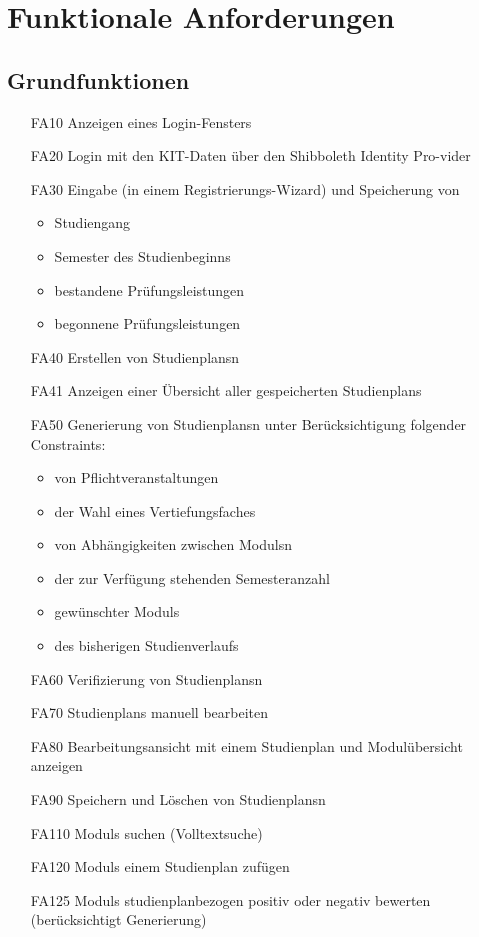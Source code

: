 \section{Funktionale Anforderungen}

	\subsection{Grundfunktionen}
	\begin{itemize}[nosep]	
		\item [FA10] Anzeigen eines Login-Fensters
		\item[FA20] Login mit den KIT-Daten über den Shibboleth Identity Pro-vider
		\item [FA30]Eingabe (in einem Registrierungs-\gls{Wizard}) und Speicherung von
		\begin{itemize}[nosep]
			\item Studiengang
			\item \gls {Semester des Studienbeginns}
			\item bestandene Prüfungsleistungen
			\item begonnene Prüfungsleistungen
		\end{itemize}
		\item [FA40] Erstellen von \glspl{Studienplan}n
		\item [FA41]Anzeigen einer Übersicht aller gespeicherten \glspl{Studienplan}
		\item [FA50] Generierung von \glspl{Studienplan}n unter Berücksichtigung folgender Constraints:
			\begin{itemize}[nosep]
			\item von Pflichtveranstaltungen
			\item der Wahl eines Vertiefungsfaches
			\item von Abhängigkeiten zwischen \glspl{Modul}n
			\item der zur Verfügung stehenden Semesteranzahl
			\item gewünschter \glspl{Modul}
			\item des bisherigen Studienverlaufs
			\end{itemize}
		\item [FA60] Verifizierung von \glspl{Studienplan}n
		\item [FA70] \glspl{Studienplan} manuell bearbeiten
		\item[FA80] Bearbeitungsansicht mit einem \gls{Studienplan} und Modulübersicht anzeigen  
		\item [FA90]Speichern und Löschen von \glspl{Studienplan}n		
		\item[FA110] \glspl{Modul} suchen (Volltextsuche)
		\item[FA120] \glspl{Modul} einem \gls{Studienplan} zufügen
		\item[FA125] \glspl{Modul} studienplanbezogen positiv oder negativ bewerten (berücksichtigt Generierung)
		\end{itemize}
